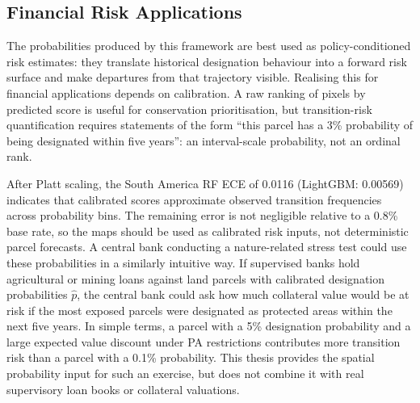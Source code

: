\documentclass[12pt]{article}
\theoremstyle{break}
\begin{document}
\subsection{Financial Risk Applications}
\label{sec:disc_calibration}
The probabilities produced by this framework are best used as policy-conditioned risk
estimates: they translate historical designation behaviour into a forward risk surface
and make departures from that trajectory visible. Realising this for financial
applications depends on calibration. A raw ranking of pixels by predicted score is
useful for conservation prioritisation, but transition-risk quantification requires
statements of the form ``this parcel has a 3\% probability of being designated within
five years'': an interval-scale probability, not an ordinal rank.

After Platt scaling, the South America RF ECE of 0.0116 (LightGBM: 0.00569) indicates
that calibrated scores approximate observed transition frequencies across probability
bins. The remaining error is not negligible relative to a 0.8\% base rate, so the
maps should be used as calibrated risk inputs, not deterministic parcel forecasts.
A central bank conducting a nature-related stress test could use these probabilities
in a similarly intuitive way. If supervised banks hold agricultural or mining loans
against land parcels with calibrated designation probabilities $\hat{p}$, the central
bank could ask how much collateral value would be at risk if the most exposed parcels
were designated as protected areas within the next five years. In simple terms, a
parcel with a 5\% designation probability and a large expected value discount under
PA restrictions contributes more transition risk than a parcel with a 0.1\% probability.
This thesis provides the spatial probability input for such an exercise, but does not
combine it with real supervisory loan books or collateral valuations.
\end{document}
